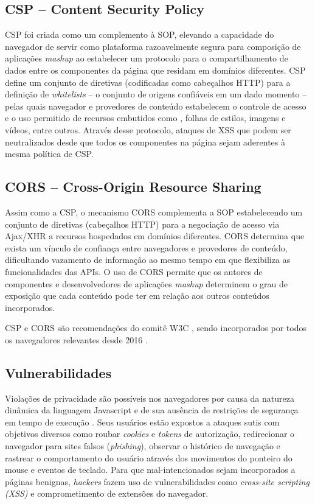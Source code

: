 \subsection{CSP -- Content Security Policy}
CSP foi criada como um complemento à SOP, elevando a capacidade do navegador de servir como plataforma razoavelmente segura para composição de aplicações \textit{mashup} ao estabelecer um protocolo para o compartilhamento de dados entre os componentes da página que residam em domínios diferentes. CSP define um conjunto de diretivas (codificadas como cabeçalhos HTTP) para a definição de \textit{whitelists} -- o conjunto de origens confiáveis em um dado momento -- pelas quais navegador e provedores de conteúdo estabelecem o controle de acesso e o uso permitido de recursos embutidos como \scripts, folhas de estilos, imagens e vídeos, entre outros. Através desse protocolo, ataques de XSS que podem ser neutralizados desde que todos os componentes na página sejam aderentes à mesma política de CSP.

\subsection{CORS -- Cross-Origin Resource Sharing}
Assim como a CSP, o mecanismo CORS \cite{W3C:CORS} complementa a SOP estabelecendo um conjunto de diretivas (cabeçalhos HTTP) para a negociação de acesso via Ajax/XHR a recursos hospedados em domínios diferentes. CORS determina que exista um vínculo de confiança entre navegadores e provedores de conteúdo, dificultando vazamento de informação ao mesmo tempo em que flexibiliza as funcionalidades das APIs. O uso de CORS permite que os autores de componentes e desenvolvedores de aplicações \textit{mashup} determinem o grau de exposição que cada conteúdo pode ter em relação aos outros conteúdos incorporados.

CSP e CORS são recomendações do comitê W3C \cite{W3C:CSP} \cite{W3C:CORS}, sendo incorporados por todos os navegadores relevantes desde 2016 \cite{CanIUse:CSP} \cite{CanIUse:CORS}.

\subsection{Vulnerabilidades}
Violações de privacidade são possíveis nos navegadores por causa da natureza dinâmica da linguagem Javascript e de sua ausência de restrições de segurança em tempo de execução \cite{Jang2010}. Seus usuários estão expostos a ataques sutis com objetivos diversos como roubar \textit{cookies} e \textit{tokens} de autorização, redirecionar o navegador para sites falsos (\textit{phishing}), observar o histórico de navegação e rastrear o comportamento do usuário através dos movimentos do ponteiro do mouse e eventos de teclado. Para que \scripts mal-intencionados sejam incorporados a páginas benignas, \textit{hackers} fazem uso de vulnerabilidades como \textit{cross-site scripting (XSS)} \cite{OWASP:XSS} e comprometimento de extensões \cite{Heule2015_Most_Dangerous_Code} do navegador.



